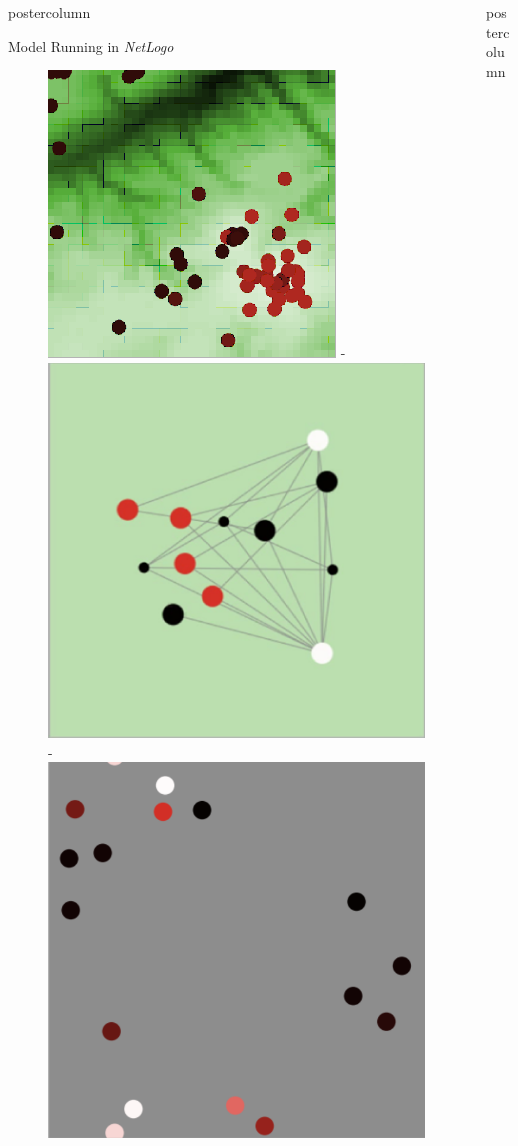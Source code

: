 \documentclass[final,hyperref={pdfpagelabels=false}]{beamer}
\newlength{\columnheight}
\begin{document}
\begin{frame}
\begin{columns}
\begin{column}{.33\textwidth}
\begin{beamercolorbox}[center,wd=\textwidth]{postercolumn}
\begin{minipage}[T]{.95\textwidth}
{\begin{block}{Model Running in \textit{NetLogo}}
              \begin{figure}
                \centering
                \includegraphics[width=0.32\linewidth]{images/netlogo}
                -
                \includegraphics[width=0.32\linewidth]{images/networks}
                -
                \includegraphics[width=0.32\linewidth]{images/random_movement}
              \end{figure}
            \end{block}
          }
        \end{minipage}
      \end{beamercolorbox}
    \end{column}

    \begin{column}{.33\textwidth}
      \begin{beamercolorbox}[center,wd=\textwidth]{postercolumn}
        \begin{minipage}[T]{.95\textwidth} %
          \parbox[t][\columnheight]{\textwidth}{ %

}
\end{minipage}
\end{beamercolorbox}
\end{column}
\end{columns}
\end{frame}
\end{document}
